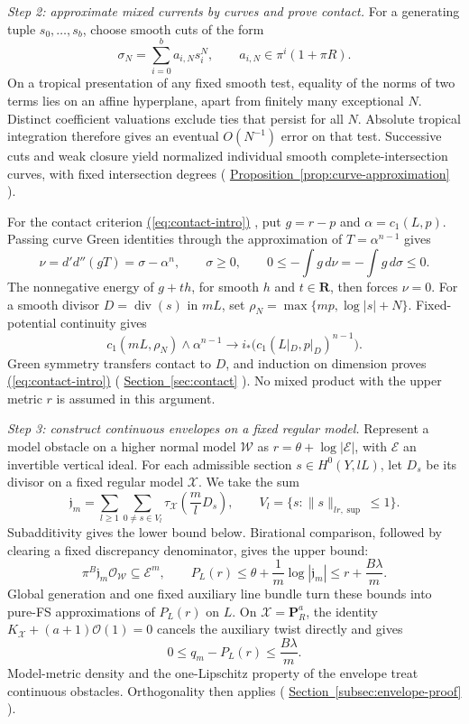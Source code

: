 \documentclass[11pt]{amsart}
\theoremstyle{definition}
\theoremstyle{remark}
\numberwithin{equation}{section}
\newcommand{\ddc}{d'd''}
\newcommand{\R}{\mathbf R}
\newcommand{\PP}{\mathbf P}
\newcommand{\OO}{\mathcal O}
\newcommand{\cX}{\mathscr X}
\newcommand{\cW}{\mathscr W}
\newcommand{\cE}{\mathscr E}
\newcommand{\namedref}[2]{%
 \begingroup
 \ifstrequal{#1}{Section}{\hypersetup{linkcolor=sectionteal}}{%
  \ifstrequal{#1}{Appendix}{\hypersetup{linkcolor=sectionteal}}{}}%
 \hyperref[#2]{#1~\ref*{#2}}%
 \endgroup}
\renewcommand{\eqref}[1]{%
 \begingroup\hypersetup{linkcolor=equationviolet}%
 \hyperref[#1]{\textup{(\ref*{#1})}}%
 \endgroup}
\DeclareMathOperator{\divisor}{div}
\begin{document}
\emph{Step 2: approximate mixed currents by curves and prove contact.}
For a generating tuple \(s_0,\ldots,s_b\), choose smooth cuts of
the form
\[
 \sigma_N=\sum_{i=0}^b a_{i,N}s_i^N,
 \qquad a_{i,N}\in\pi^i(1+\pi R).
\]
On a tropical presentation of any fixed smooth test, equality of
the norms of two terms lies on an affine hyperplane, apart from
finitely many exceptional \(N\). Distinct coefficient valuations
exclude ties that persist for all \(N\).
Absolute tropical integration therefore gives an eventual
\(O(N^{-1})\) error on that test. Successive cuts and weak closure
yield normalized individual smooth complete-intersection curves,
with fixed intersection degrees
(\namedref{Proposition}{prop:curve-approximation}).

For the contact criterion \eqref{eq:contact-intro}, put
\(g=r-p\) and \(\alpha=c_1(L,p)\).
Passing curve Green identities through the approximation of
\(T=\alpha^{n-1}\) gives
\[
 \nu=\ddc(gT)=\sigma-\alpha^n,\qquad \sigma\geq0,\qquad
 0\leq-\int g\,d\nu=-\int g\,d\sigma\leq0.
\]
The nonnegative energy of \(g+th\), for smooth \(h\) and \(t\in\R\),
then forces \(\nu=0\).
For a smooth divisor \(D=\divisor(s)\) in \(mL\), set
\(\rho_N=\max\{mp,\log|s|+N\}\). Fixed-potential continuity gives
\begin{equation}\label{eq:divisor-intro}
 c_1(mL,\rho_N)\wedge\alpha^{n-1}
 \longrightarrow i_*\bigl(c_1(L|_D,p|_D)^{n-1}\bigr).
\end{equation}
Green symmetry transfers contact to \(D\), and induction on
dimension proves \eqref{eq:contact-intro}
(\namedref{Section}{sec:contact}). No mixed product with the upper metric
\(r\) is assumed in this argument.

\emph{Step 3: construct continuous envelopes on a fixed regular model.}
Represent a model obstacle on a higher normal model \(\cW\) as
\(r=\theta+\log|\cE|\), with \(\cE\) an invertible vertical ideal.
For each admissible section \(s\in H^0(Y,lL)\), let \(D_s\) be its
divisor on a fixed regular model \(\cX\). We take the sum
\[
 \mathfrak j_m=\sum_{l\ge1}\sum_{0\ne s\in V_l}
       \tau_{\cX}\!\left(\frac mlD_s\right),
 \qquad V_l=\{s:\|s\|_{lr,\sup}\le1\}.
\]
Subadditivity gives the lower bound below. Birational comparison,
followed by clearing a fixed discrepancy denominator, gives the upper bound:
\begin{equation}\label{eq:ideal-intro}
 \pi^B\mathfrak j_m\OO_{\cW}\subseteq\cE^m,\qquad
 P_L(r)\leq\theta+\frac1m\log|\mathfrak j_m|
 \leq r+\frac{B\lambda}{m}.
\end{equation}
Global generation and one fixed auxiliary line bundle turn these bounds
into pure-FS approximations of \(P_L(r)\) on \(L\).
On \(\cX=\PP_R^a\), the identity
\(K_{\cX}+(a+1)\OO(1)=0\) cancels the auxiliary twist directly and gives
\begin{equation}\label{eq:rate-intro}
 0\leq q_m-P_L(r)\leq\frac{B\lambda}{m}.
\end{equation}
Model-metric density and the one-Lipschitz property of the envelope
treat continuous obstacles. Orthogonality \cite[Theorem 6.7]{BGM}
then applies (\namedref{Section}{subsec:envelope-proof}).
\end{document}
